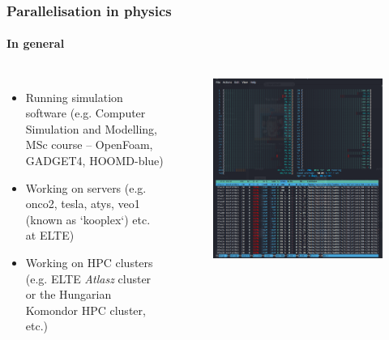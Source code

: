 \begin{frame}
\frametitle{Parallelisation in physics}
\framesubtitle{In general}

\begin{columns}
	{\small
	\begin{itemize}
		\item Running simulation software (e.g. Computer Simulation and Modelling, MSc course -- OpenFoam, GADGET4, HOOMD-blue)
		\item Working on servers (e.g. onco2, tesla, atys, veo1 (known as `kooplex`) etc. at ELTE)
		\item Working on HPC clusters (e.g. ELTE \textit{Atlasz} cluster or the Hungarian Komondor HPC cluster, etc.)
	\end{itemize}}
	
	\begin{figure}
		\includegraphics[width=\textwidth]{img/onco2.png}
	\end{figure}

\end{columns}

\end{frame}